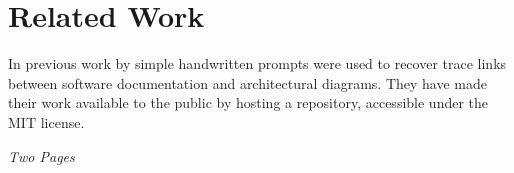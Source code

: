 \chapter{Related Work}
In previous work by 
simple handwritten prompts were used to recover trace links between software documentation and architectural diagrams. They have made their work available to the public by hosting a repository, accessible under the MIT license.

\textit{Two Pages}